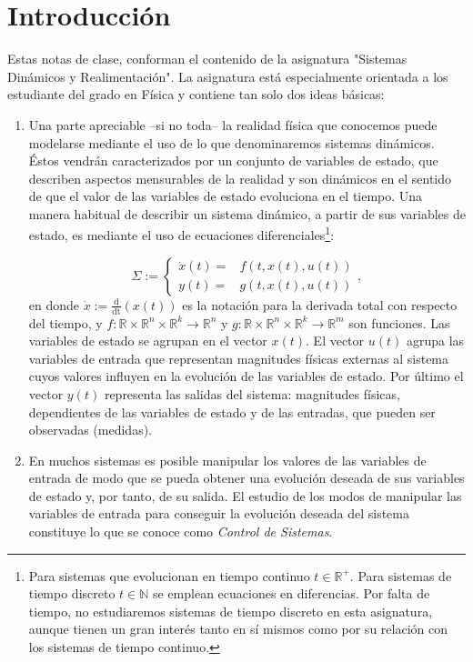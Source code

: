\chapter{Introducción}
Estas notas de clase, conforman el contenido de la asignatura "Sistemas Dinámicos y Realimentación". La asignatura está especialmente orientada  a los estudiante del grado en Física y contiene tan solo dos ideas básicas:

\begin{enumerate}
\item Una parte apreciable --si no toda-- la realidad física que conocemos puede modelarse mediante el uso de lo que denominaremos sistemas dinámicos. Éstos vendrán caracterizados por un conjunto de variables de estado, que describen aspectos mensurables de la realidad y son dinámicos en el sentido de que el valor de las variables de estado evoluciona en el tiempo. Una manera habitual de describir un sistema dinámico, a partir de sus variables de estado, es mediante el uso de ecuaciones diferenciales\footnote{Para sistemas que evolucionan en tiempo continuo $t\in \mathbb{R}^+$. Para sistemas de tiempo discreto $t \in \mathbb{N}$ se emplean ecuaciones en diferencias. Por falta de tiempo, no estudiaremos sistemas de tiempo discreto en esta asignatura, aunque tienen un gran interés tanto en sí mismos como por su relación con los sistemas de tiempo continuo.}:

\begin{equation}
	\Sigma := \begin{cases}
		\dot x(t) =& f(t,x(t),u(t)) \\ y(t) =& g(t,x(t),u(t))
	\end{cases}, 
\end{equation}
en donde $\dot x := \frac{\mathrm{d}}{\mathrm{dt}}(x(t))$ es la notación para la derivada total con respecto del tiempo, y $f:\mathbb{R} \times \mathbb{R}^n \times \mathbb{R}^k \to \mathbb{R}^n$ y $g: \mathbb{R} \times \mathbb{R}^n \times \mathbb{R}^k \to \mathbb{R}^m$ son funciones. Las variables de estado se agrupan en el vector $x(t)$.  El vector $u(t)$ agrupa las variables de entrada que representan magnitudes físicas externas al sistema cuyos valores influyen en la evolución de las variables de estado. Por último el vector $y(t)$ representa las salidas del sistema: magnitudes físicas, dependientes de las variables de estado y de las entradas, que pueden ser observadas (medidas). 

\item En muchos sistemas es posible manipular los valores de las variables de entrada de modo que se pueda obtener una evolución deseada de sus variables de estado y, por tanto, de su salida. El estudio de los modos de manipular las variables de entrada para conseguir la evolución deseada del sistema constituye lo que se conoce como \emph{Control de Sistemas}.


\end{enumerate}
